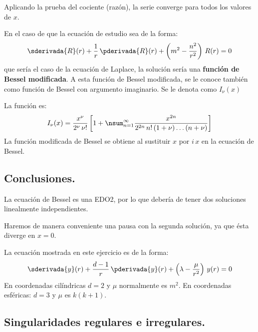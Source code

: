 Aplicando la prueba del cociente (razón), la serie converge para todos los valores de $x$.
\par
En el caso de que la ecuación de estudio sea de la forma:
\begin{align*}
\sderivada{R} (r) + \dfrac{1}{r} \, \pderivada{R} (r) + \left( m^{2} - \dfrac{n^{2}}{r^{2}} \right) \, R (r) = 0
\end{align*}
que sería el caso de la ecuación de Laplace, la solución sería una \textbf{función de Bessel modificada}. A esta función de Bessel modificada, se le conoce también como función de Bessel con argumento imaginario. Se le denota como $I_{\nu} (x)$
\par
La función es:
\begin{align*}
I_{\nu}(x) = \dfrac{x^{\nu}}{2^{\nu} \, \nu!} \left[ 1 + \nsum_{n=1}^{\infty} \dfrac{x^{2n}}{2^{2n} \, n! \, (1 + \nu) \ldots (n + \nu)} \right]
\end{align*}
La función modificada de Bessel se obtiene al sustituir $x$ por $i \, x$ en la ecuación de Bessel.

\subsection*{Conclusiones.}

La ecuación de Bessel es una EDO2, por lo que debería de tener dos soluciones linealmente independientes.
\par
Haremos de manera conveniente una pausa con la segunda solución, ya que ésta diverge en $x = 0$.
\par
La ecuación mostrada en este ejercicio es de la forma:
\begin{align*}
\sderivada{y}(r) + \dfrac{d - 1}{r} \, \pderivada{y}(r) + \left( \lambda - \dfrac{\mu}{r^{2}} \right) \, y(r) = 0
\end{align*}
En coordenadas cilíndricas $d = 2$ y $\mu$ normalmente es $m^{2}$. En coordenadas esféricas: $d = 3$ y $\mu$ es $k(k+1)$.

\subsection{Singularidades regulares e irregulares.}

